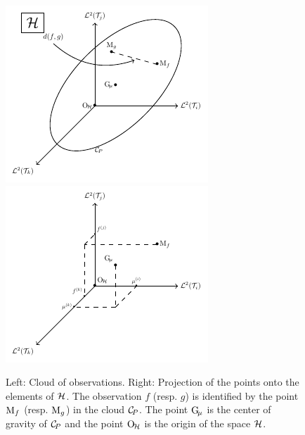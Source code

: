 \begin{figure}
    \centering
    \includegraphics[scale=1.2]{figures/cloud_obs.pdf}
    \includegraphics[scale=1.2]{figures/cloud_obs_proj.pdf}
    \caption{Left: Cloud of observations. Right: Projection of the points onto the elements of $\mathcal{H}$. The observation $f$ (resp. $g$) is identified by the point $\mathrm{M}_f$ (resp. $\mathrm{M}_g$) in the cloud $\mathcal{C}_{\!P}$. The point $\mathrm{G}_{\!\mu}$ is the center of gravity of $\mathcal{C}_{\!P}$ and the point $\mathrm{O}_{\!\mathcal{H}}$ is the origin of the space $\mathcal{H}$.}
    \label{fig:cloud_obs}
\end{figure}

